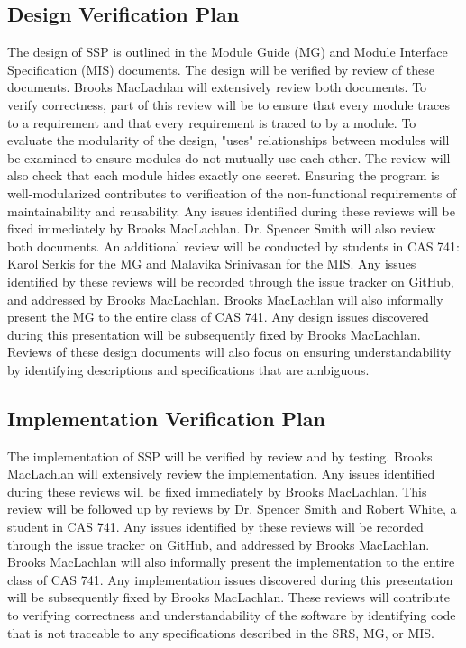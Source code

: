 \documentclass[12pt, titlepage]{article}
\newcommand{\progname}{SSP}
\begin{document}
\subsection{Design Verification Plan}

\noindent The design of \progname{} is outlined in the Module Guide (MG) and 
Module Interface Specification (MIS) documents. The design will be verified by 
review of these documents. Brooks MacLachlan will extensively review both 
documents. To verify correctness, part of this review will be to ensure that 
every module traces to a requirement and that every requirement is traced to by 
a module. To evaluate the modularity of the design, "uses" relationships 
between modules will be examined to ensure modules do not mutually use each 
other. The review will also check that each module hides exactly one secret. 
Ensuring the program is well-modularized contributes to verification of the 
non-functional requirements of maintainability and reusability. Any issues 
identified during these reviews will be fixed immediately by Brooks MacLachlan. 
Dr. Spencer Smith will also review both documents. An additional review will be 
conducted by students in CAS 741: Karol Serkis for the MG and Malavika 
Srinivasan for the MIS. Any issues identified by these reviews will be recorded 
through the issue tracker on GitHub, and addressed by Brooks 
MacLachlan. Brooks MacLachlan will also informally present the MG to the entire 
class of CAS 741. Any design issues discovered during this presentation will be 
subsequently fixed by Brooks MacLachlan. Reviews of these design documents will 
also focus on ensuring understandability by identifying descriptions and 
specifications that are ambiguous.

\subsection{Implementation Verification Plan} \label{sec_ImpPlan}

\noindent The implementation of \progname{} will be verified by review and by 
testing. Brooks MacLachlan will extensively review the implementation. Any 
issues identified during these reviews will be fixed immediately by Brooks 
MacLachlan. This review will be followed up by reviews by Dr. Spencer Smith and 
Robert White, a student in CAS 741. Any  issues identified by these reviews 
will be recorded through the issue tracker on GitHub, and addressed by Brooks 
MacLachlan. Brooks MacLachlan will also informally present the implementation 
to the entire class of CAS 741. Any implementation issues discovered during 
this presentation will be subsequently fixed by Brooks MacLachlan. These 
reviews will contribute to verifying correctness and understandability of the 
software by identifying code that is not traceable to any specifications 
described in the SRS, MG, or MIS.
\newline
\end{document}
